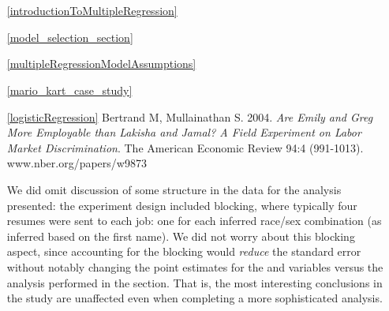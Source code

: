 \section{}
\label{ch_regr_mult_and_log_data}

\begin{itemize}
\setlength{\itemsep}{0mm}
\item[\ref{introductionToMultipleRegression}]

\item[\ref{model_selection_section}]

\item[\ref{multipleRegressionModelAssumptions}]

\item[\ref{mario_kart_case_study}]

\item[\ref{logisticRegression}]
    Bertrand M, Mullainathan S. 2004.
    \emph{Are Emily and Greg More Employable than Lakisha and Jamal?
    A Field Experiment on Labor Market Discrimination}.
    The American Economic Review 94:4 (991-1013).
        {www.nber.org/papers/w9873}

    We did omit discussion of some structure in
    the data for the analysis presented:
    the experiment design included blocking,
    where typically four resumes were sent to each job:
    one for each inferred race/sex combination
    (as inferred based on the first name).
    We did not worry about this blocking aspect,
    since accounting for the blocking would
    \emph{reduce} the standard error without notably
    changing the point estimates for the
     and  variables
    versus the analysis performed in the section.
    That is, the most interesting conclusions in the
    study are unaffected even when completing a more
    sophisticated analysis.

%

\end{itemize}

